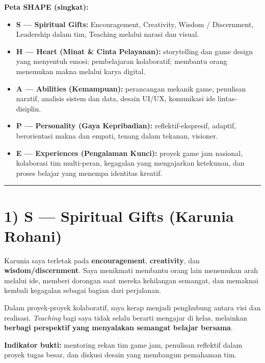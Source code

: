 \documentclass[
  letterpaper,
  DIV=11,
  numbers=noendperiod]{scrreprt}
\providecommand{\tightlist}{%
  \setlength{\itemsep}{0pt}\setlength{\parskip}{0pt}}
\begin{document}
\textbf{Peta SHAPE (singkat):}

\begin{itemize}
\tightlist
\item
  \textbf{S --- Spiritual Gifts:} Encouragement, Creativity, Wisdom /
  Discernment, Leadership dalam tim, Teaching melalui narasi dan
  visual.\\
\item
  \textbf{H --- Heart (Minat \& Cinta Pelayanan):} storytelling dan game
  design yang menyentuh emosi; pembelajaran kolaboratif; membantu orang
  menemukan makna melalui karya digital.\\
\item
  \textbf{A --- Abilities (Kemampuan):} perancangan mekanik game,
  penulisan naratif, analisis sistem dan data, desain UI/UX, komunikasi
  ide lintas-disiplin.\\
\item
  \textbf{P --- Personality (Gaya Kepribadian):} reflektif-ekspresif,
  adaptif, berorientasi makna dan empati, tenang dalam tekanan,
  visioner.\\
\item
  \textbf{E --- Experiences (Pengalaman Kunci):} proyek game jam
  nasional, kolaborasi tim multi-peran, kegagalan yang mengajarkan
  ketekunan, dan proses belajar yang menempa identitas kreatif.
\end{itemize}

\begin{center}\rule{0.5\linewidth}{0.5pt}\end{center}

\section{1) S --- Spiritual Gifts (Karunia
Rohani)}\label{s-spiritual-gifts-karunia-rohani}

Karunia saya terletak pada \textbf{encouragement}, \textbf{creativity},
dan \textbf{wisdom/discernment}. Saya menikmati membantu orang lain
menemukan arah melalui ide, memberi dorongan saat mereka kehilangan
semangat, dan memaknai kembali kegagalan sebagai bagian dari perjalanan.

Dalam proyek-proyek kolaboratif, saya kerap menjadi penghubung antara
visi dan realisasi. \emph{Teaching} bagi saya tidak selalu berarti
mengajar di kelas, melainkan \textbf{berbagi perspektif yang menyalakan
semangat belajar bersama}.

\textbf{Indikator bukti:} mentoring rekan tim game jam, penulisan
reflektif dalam proyek tugas besar, dan diskusi desain yang membangun
pemahaman tim.
\end{document}
